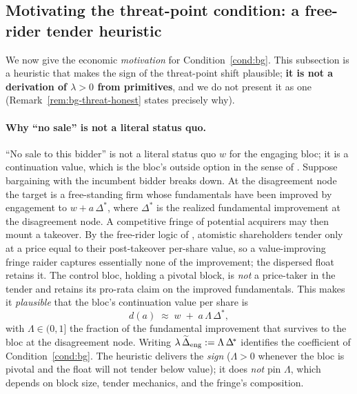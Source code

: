 \documentclass[11pt]{article}
\newcommand{\1}{\mathbf{1}}
\begin{document}
\subsection{Motivating the threat-point condition: a free-rider tender heuristic}
\label{app:bg-threat}

We now give the economic \emph{motivation} for Condition~\ref{cond:bg}. This subsection is a heuristic that makes the sign of the threat-point shift plausible; \textbf{it is not a derivation of $\lambda>0$ from primitives}, and we do not present it as one (Remark~\ref{rem:bg-threat-honest} states precisely why).

\paragraph{Why ``no sale'' is not a literal status quo.}
``No sale to this bidder'' is not a literal status quo $w$ for the engaging bloc; it is a continuation value, which is the bloc's outside option in the sense of \citet{BinmoreRubinsteinWolinsky1986}. Suppose bargaining with the incumbent bidder breaks down. At the disagreement node the target is a free-standing firm whose fundamentals have been improved by engagement to $w+a\,\Delta^{\!*}$, where $\Delta^{\!*}$ is the realized fundamental improvement at the disagreement node. A competitive fringe of potential acquirers may then mount a takeover. By the free-rider logic of \citet{GrossmanHart1980}, atomistic shareholders tender only at a price equal to their post-takeover per-share value, so a value-improving fringe raider captures essentially none of the improvement; the dispersed float retains it. The control bloc, holding a pivotal block, is \emph{not} a price-taker in the tender and retains its pro-rata claim on the improved fundamentals. This makes it \emph{plausible} that the bloc's continuation value per share is
\begin{equation}
  \label{eq:bg-threat-motiv}
  d(a)\;\approx\;w\;+\;a\,\Lambda\,\Delta^{\!*},
\end{equation}
with $\Lambda\in(0,1]$ the fraction of the fundamental improvement that survives to the bloc at the disagreement node. Writing $\lambda\,\widetilde{\Delta}_{\mathrm{eng}}:=\Lambda\,\Delta^{\!*}$ identifies the coefficient of Condition~\ref{cond:bg}. The heuristic delivers the \emph{sign} ($\Lambda>0$ whenever the bloc is pivotal and the float will not tender below value); it does \emph{not} pin $\Lambda$, which depends on block size, tender mechanics, and the fringe's composition.
\end{document}
